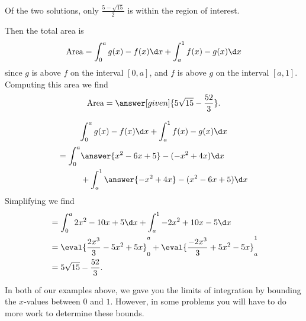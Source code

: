 \documentclass{ximera}
\begin{document}
\begin{example}
\begin{explanation}
\begin{hint}
Of the two solutions, only $\frac{5-\sqrt{15}}{2}$ is within the region of interest.
\end{hint}
Then the total area is 
\[
\textrm{Area} = \int_0^a g(x) - f(x) \d x + \int_a^1 f(x) - g(x) \d x
\]
since $g$ is above $f$ on the interval $[0,a]$, and $f$ is above $g$
on the interval $[a,1]$.  Computing this area we find
\[
\textrm{Area} = \answer[given]{5\sqrt{15} - \frac{52}{3}}.
\]
\begin{hint}
  \[
  \int_0^a g(x) - f(x) \d x + \int_a^1 f(x) - g(x) \d x
  \]
  \begin{align*}
    = \int_0^a & \answer{x^2-6x+5}-(-x^2+4x)\d x \\
    &+\int_a^1 \answer{-x^2+4x}-(x^2-6x+5)\d x
  \end{align*}
  Simplifying we find
  \begin{align*}
    &=\int_0^a 2x^2-10x+5\d x+\int_a^1 -2x^2+10x-5\d x \\
    &= \eval{\frac{2x^3}{3}-5x^2+5x}_0^a + \eval{ \frac{-2x^3}{3}+5x^2-5x}_a^1 \\
    &= 5\sqrt{15}-\frac{52}{3}.
  \end{align*}
\end{hint}
\end{explanation}
\end{example}

In both of our examples above, we gave you the limits of integration
by bounding the $x$-values between $0$ and $1$. However, in some problems
you will have to do more work to determine these bounds.
\end{document}
